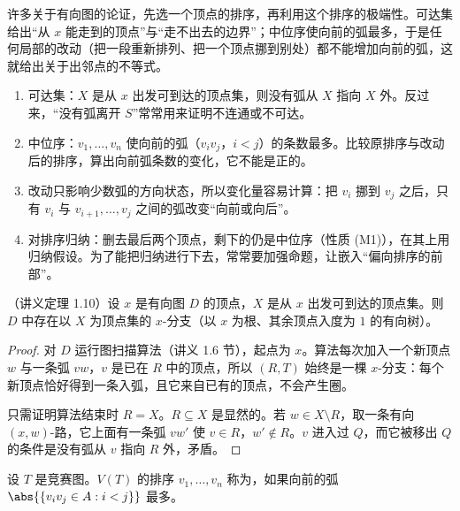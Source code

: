 \label{lec:orderings}

许多关于有向图的论证，先选一个顶点的排序，再利用这个排序的极端性。可达集给出“从 $x$ 能走到的顶点”与“走不出去的边界”；中位序使向前的弧最多，于是任何局部的改动（把一段重新排列、把一个顶点挪到别处）都不能增加向前的弧，这就给出关于出邻点的不等式。


\begin{enumerate}
\item 可达集：$X$ 是从 $x$ 出发可到达的顶点集，则没有弧从 $X$ 指向 $X$ 外。反过来，“没有弧离开 $S$”常常用来证明不连通或不可达。
\item 中位序：$v_1,\dots,v_n$ 使向前的弧（$v_iv_j$，$i<j$）的条数最多。比较原排序与改动后的排序，算出向前弧条数的变化，它不能是正的。
\item 改动只影响少数弧的方向状态，所以变化量容易计算：把 $v_i$ 挪到 $v_j$ 之后，只有 $v_i$ 与 $v_{i+1},\dots,v_j$ 之间的弧改变“向前或向后”。
\item 对排序归纳：删去最后两个顶点，剩下的仍是中位序（性质 (M1)），在其上用归纳假设。为了能把归纳进行下去，常常要加强命题，让嵌入“偏向排序的前部”。
\end{enumerate}

\begin{theorem}\label{thm:orderings:branching}
（讲义定理 1.10）设 $x$ 是有向图 $D$ 的顶点，$X$ 是从 $x$ 出发可到达的顶点集。则 $D$ 中存在以 $X$ 为顶点集的 $x$-分支（以 $x$ 为根、其余顶点入度为 $1$ 的有向树）。
\end{theorem}
\begin{proof}
对 $D$ 运行图扫描算法（讲义 1.6 节），起点为 $x$。算法每次加入一个新顶点 $w$ 与一条弧 $vw$，$v$ 是已在 $R$ 中的顶点，所以 $(R,T)$ 始终是一棵 $x$-分支：每个新顶点恰好得到一条入弧，且它来自已有的顶点，不会产生圈。

只需证明算法结束时 $R=X$。$R\subseteq X$ 是显然的。若 $w\in X\setminus R$，取一条有向 $(x,w)$-路，它上面有一条弧 $vw'$ 使 $v\in R$，$w'\notin R$。$v$ 进入过 $Q$，而它被移出 $Q$ 的条件是没有弧从 $v$ 指向 $R$ 外，矛盾。
\end{proof}

设 $T$ 是竞赛图。$V(T)$ 的排序 $v_1,\dots,v_n$ 称为，如果向前的弧 $\abs{\{v_iv_j\in A: i<j\}}$ 最多。

